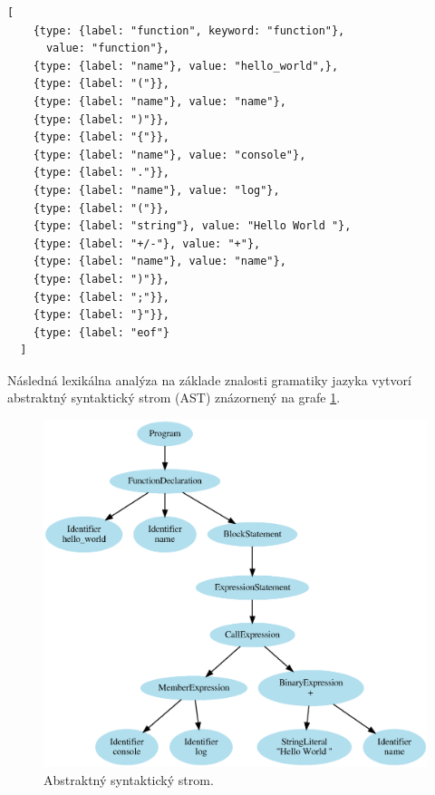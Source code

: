 \begin{lstlisting}[caption=Výstup lexikálnej analýzy,label=listing:lexical]
  [
    {type: {label: "function", keyword: "function"},
      value: "function"},
    {type: {label: "name"}, value: "hello_world",},
    {type: {label: "("}},
    {type: {label: "name"}, value: "name"},
    {type: {label: ")"}},
    {type: {label: "{"}},
    {type: {label: "name"}, value: "console"},
    {type: {label: "."}},
    {type: {label: "name"}, value: "log"},
    {type: {label: "("}},
    {type: {label: "string"}, value: "Hello World "},
    {type: {label: "+/-"}, value: "+"},
    {type: {label: "name"}, value: "name"},
    {type: {label: ")"}},
    {type: {label: ";"}},
    {type: {label: "}"}},
    {type: {label: "eof"}
  ]
\end{lstlisting}

Následná lexikálna analýza na základe znalosti gramatiky jazyka vytvorí abstraktný syntaktický strom (AST) znázornený na grafe \ref{fig:ast}.

\begin{figure}[!htb]
  \centering
  \includegraphics[scale=.7]{ast.eps}
  \caption{Abstraktný syntaktický strom.}
  \label{fig:ast}
\end{figure}

